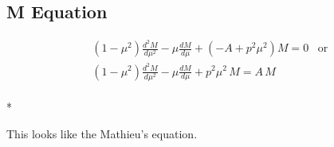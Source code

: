\documentclass[11pt, oneside]{article}   	%
\begin{document}
\subsection*{M Equation}

\begin{equation}\label{M}
\begin{split}
 & \left(1 - \mu^2 \right) \frac{d^2M}{ d\mu^2 } - \mu\frac{ dM }{d\mu } +  \left(-A  + p^2\mu^2  \right)M = 0\,\,\,\text{ or } \\[.8em]
 & \left(1 - \mu^2 \right) \frac{d^2M}{ d\mu^2 } - \mu\frac{ dM }{d\mu } +   p^2\mu^2\,M = A\,M
 \end{split}
\end{equation}\\*

This looks like the Mathieu's equation.
\end{document}
